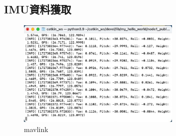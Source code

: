 \documentclass[12pt]{article}       %
\begin{document}
\subsection{IMU資料獲取}
\hspace{2em}
\begin{figure}[H]
    \centering
    \includegraphics[width=0.7\textwidth]{mavlink.jpg}     %
    \caption{mavlink}    %
    \label{fig:mavlink}    %
\end{figure}
\end{document}
